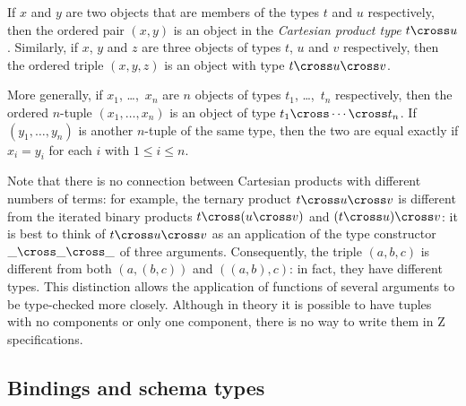 \new If $x$ and $y$ are two objects that are members of the types
$t$ and $u$ respectively, then the ordered pair
$(x, y)$ is an object in the {\em Cartesian product type\/}%
\symdex{$\cross$}%
$t \cross u$. Similarly,
if $x$, $y$ and $z$ are three objects of types $t$, $u$ and $v$
respectively, then the ordered triple $(x, y, z)$ is an object
with type $t \cross u \cross v$.

More generally, if $x_1$, \dots,~$x_n$ are $n$ objects of types
$t_1$, \dots,~$t_n$ respectively, then the ordered
$n$-tuple $(x_1, \ldots, x_n)$ is an object of type
$t_1 \cross \cdots \cross t_n$.  If $(y_1, \ldots, y_n)$ is another
$n$-tuple of the same type, then the two are equal exactly if $x_i =
y_i$ for each $i$ with $1 \leq i \leq n$.

\new Note that there is no connection between Cartesian products with
different numbers of terms: for example, the ternary
product $t \cross u \cross v$ is different from the iterated binary
products $t \cross (u \cross v)$ and $(t \cross u) \cross v$:
it is best to think of $t \cross u \cross v$ as an application
of the type constructor $\_ \cross \_ \cross \_$ of three arguments.
Consequently, the triple $(a, b, c)$ is different from both
$(a, (b, c))$ and $((a, b), c)$: in fact, they have different
types. This distinction allows the application of functions of
several arguments to be type-checked more closely.
Although in theory it is possible to have tuples with no components or only
one component, there is no way to write them in Z specifications.

\subsection{Bindings and schema types}

